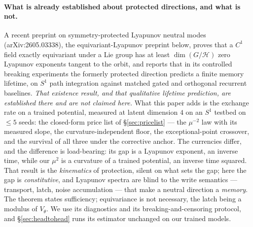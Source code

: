 \documentclass{article}
\begin{document}
\paragraph{What is already established about protected directions, and what is not.} A recent preprint on symmetry-protected Lyapunov
neutral modes (arXiv:2605.03338), the equivariant-Lyapunov preprint below, proves that a $C^1$ field exactly equivariant under a Lie group
has at least $\dim(G/\mathcal H)$ zero Lyapunov exponents tangent to the orbit, and reports that in its controlled breaking experiments
the formerly protected direction predicts a finite memory lifetime, on $S^1$ path integration against matched gated and orthogonal
recurrent baselines. \emph{That existence result, and that qualitative lifetime prediction, are established there and are not claimed
here.} What this paper adds is the exchange rate on a trained potential, measured at latent dimension $4$ on an $S^1$ testbed on $\le5$
seeds: the closed-form price list of \S\ref{sec:pricelist} --- the
$\mu^{-2}$ law with its measured slope, the curvature-independent floor, the exceptional-point crossover, and the survival of all three
under the corrective anchor. The currencies differ, and the difference is load-bearing: its gap is a Lyapunov exponent, an inverse time,
while our $\mu^2$ is a curvature of a trained potential, an inverse time squared. That result is the \emph{kinematics} of protection,
silent on what sets the gap; here the gap is \emph{constitutive}, and Lyapunov spectra are blind to the write semantics --- transport,
latch, noise accumulation --- that make a neutral direction a \emph{memory}. The theorem states sufficiency; equivariance is not necessary,
the latch being a modulus of $V_\theta$. We use its diagnostics and its breaking-and-censoring protocol, and \S\ref{sec:headtohead} runs
its estimator unchanged on our trained models.
\end{document}
